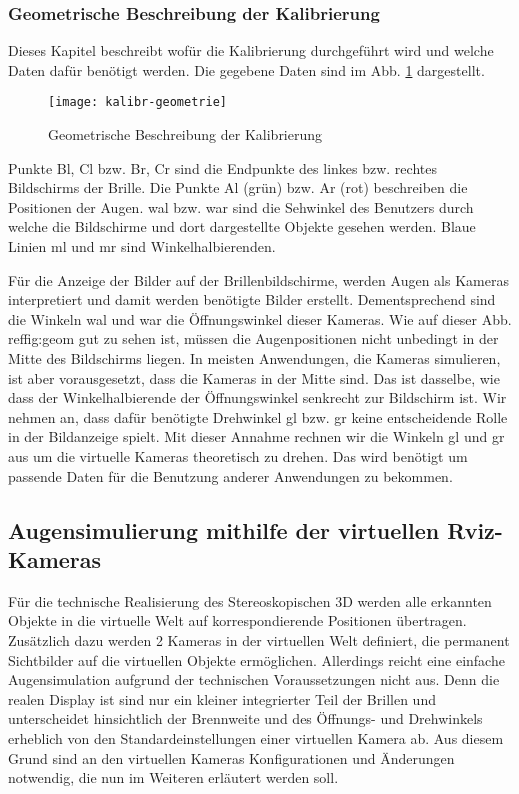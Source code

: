 \subsubsection{Geometrische Beschreibung der Kalibrierung}
Dieses Kapitel beschreibt wofür die Kalibrierung durchgeführt wird und welche Daten dafür benötigt werden.
Die gegebene Daten sind im Abb. \ref{fig:geom} dargestellt. 

\begin{figure}[h]
   \centering
   \texttt{[image: kalibr-geometrie]}
   \caption{Geometrische Beschreibung der Kalibrierung}
   \label{fig:geom}
\end{figure}

Punkte Bl, Cl bzw. Br, Cr sind die Endpunkte des linkes bzw. rechtes Bildschirms der Brille.
Die Punkte Al (grün) bzw. Ar (rot) beschreiben die Positionen der Augen.
wal bzw. war sind die Sehwinkel des Benutzers durch welche die Bildschirme und dort dargestellte Objekte gesehen werden. 
Blaue Linien ml und mr sind Winkelhalbierenden.

Für die Anzeige der Bilder auf der Brillenbildschirme, werden Augen als Kameras interpretiert und damit werden benötigte Bilder erstellt.
Dementsprechend sind die Winkeln wal und war die Öffnungswinkel dieser Kameras.
Wie auf dieser Abb. ref{fig:geom} gut zu sehen ist, müssen die Augenpositionen nicht unbedingt in der Mitte des Bildschirms liegen.
In meisten Anwendungen, die Kameras simulieren, ist aber vorausgesetzt, dass die Kameras in der Mitte sind.
Das ist dasselbe, wie dass der Winkelhalbierende der Öffnungswinkel senkrecht zur Bildschirm ist.
Wir nehmen an, dass dafür benötigte Drehwinkel gl bzw. gr keine entscheidende Rolle in der Bildanzeige spielt.
Mit dieser Annahme rechnen wir die Winkeln gl und gr aus  um die virtuelle Kameras theoretisch zu drehen.
Das wird benötigt um passende Daten für die Benutzung anderer Anwendungen zu bekommen.

\subsection{Augensimulierung mithilfe der virtuellen Rviz-Kameras }
Für die technische Realisierung des Stereoskopischen 3D werden alle erkannten Objekte in die virtuelle Welt auf korrespondierende Positionen übertragen. Zusätzlich dazu werden 2 Kameras in der virtuellen Welt definiert, die permanent Sichtbilder auf die virtuellen Objekte ermöglichen. Allerdings reicht eine einfache Augensimulation aufgrund der technischen Voraussetzungen nicht aus. Denn die realen Display ist sind nur ein kleiner integrierter Teil der Brillen und unterscheidet hinsichtlich der Brennweite und des Öffnungs- und Drehwinkels erheblich von den Standardeinstellungen einer virtuellen Kamera ab. Aus diesem Grund sind an den virtuellen Kameras Konfigurationen und Änderungen notwendig, die nun im Weiteren erläutert werden soll. 


